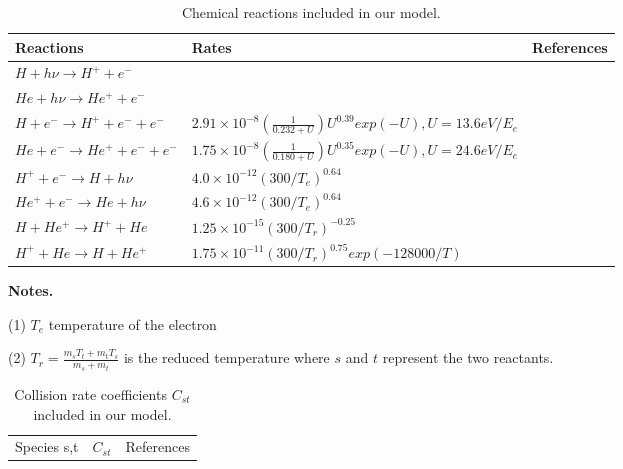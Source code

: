 \documentclass[journal, onecolumn]{aastex631}
\begin{document}
\begin{CJK*}{UTF8}{gbsn}
\begin{table}[!hp]
\begin{threeparttable}[t]
\centering
\caption{Chemical reactions included in our model.}
\begin{tabular}{lll}
\toprule
  Reactions&Rates &References\\
\midrule
  $H+h\nu\to H^{+}+e^- $&  &\cite{Ricotti2002} \\
  $He+h\nu\to He^{+}+e^- $&  &\cite{Ricotti2002} \\
  $H+e^-\to H^{+}+e^-+e^-$ &$2.91\times 10^{-8}(\frac{1}{0.232+U})U^{0.39}exp(-U), U=13.6eV/E_{e}$  &\cite{Voronov1997}\\
  $He+e^-\to He^{+}+e^-+e^-$ &$1.75\times 10^{-8}(\frac{1}{0.180+U})U^{0.35}exp(-U), U=24.6eV/E_{e}$  &\cite{Voronov1997}\\
  $H^{+}+e^-\to H + h\nu$ &$4.0\times 10^{-12}(300/T_{e})^{0.64}$\tnote{(1)}  &\cite{Storey1995} \\
  $He^{+}+e^-\to He + h\nu$ &$4.6\times 10^{-12}(300/T_{e})^{0.64}$  &\cite{Storey1995} \\
  $H+He^{+}\to H^{+}+He$ &$1.25\times 10^{-15}{(300/T_{r})}^{-0.25}$\tnote{(2)}  & \cite{Glover2007}\\
  $H^{+}+He\to H+He^{+}$ &$1.75\times 10^{-11}{(300/T_{r})}^{0.75}exp(-128000/T)$  & \cite{Glover2007}\\
\bottomrule
\end{tabular}\label{tab:che_net}

\textbf{Notes.}
\begin{tablenotes}
\item[(1)]$T_e$ temperature of the electron
\item[(2)]$T_r = \frac{m_sT_t+m_tT_s}{m_s+m_t}$ is the reduced temperature where $s$ and $t$ represent the two reactants.
\end{tablenotes}
\end{threeparttable}
\end{table}



\begin{table}[!t]
\begin{center}
\begin{threeparttable}[t]
\centering
\caption{Collision rate coefficients  $C_{st}$ included in our model. }

\begin{tabular}{lll}
\toprule
  Species s,t &$C_{st}$&References\\


\end{tabular}
\end{threeparttable}
\end{center}
\end{table}
\end{CJK*}
\end{document}
